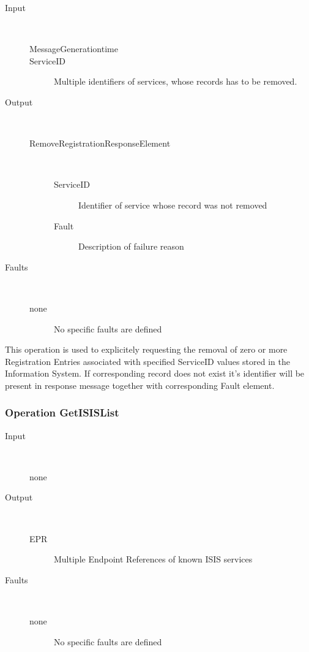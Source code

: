\documentclass{book}
\begin{document}
\begin{description}

  \item[Input]~\begin{description}
    \item[MessageGenerationtime]
    \item[ServiceID] Multiple identifiers of services, whose records has to be removed.
  \end{description}

  \item[Output]~\begin{description}
    \item[RemoveRegistrationResponseElement]~\begin{description}
      \item[ServiceID] Identifier of service whose record was not removed
      \item[Fault] Description of failure reason
    \end{description}
  \end{description}

  \item[Faults]~\begin{description}
    \item[none]No specific faults are defined
  \end{description}

\end{description}

This operation is used to explicitely requesting the removal of zero or more Registration Entries associated with specified ServiceID values stored in the Information System. If corresponding record does not exist it's identifier will be present in response message together with corresponding Fault element.

\subsubsection{Operation GetISISList}

\begin{description}

  \item[Input]~\begin{description}
    \item[none]
  \end{description}

  \item[Output]~\begin{description}
    \item[EPR] Multiple Endpoint References of known ISIS services
  \end{description}

  \item[Faults]~\begin{description}
    \item[none]No specific faults are defined
  \end{description}

\end{description}
\end{document}
